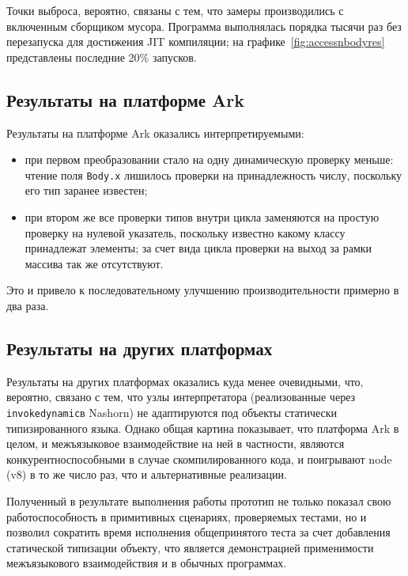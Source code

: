 \documentclass[times
]{itmo-student-thesis}
\def\Indy{\texttt{invokedynamic}}
\begin{document}
Точки выброса, вероятно, связаны с тем, что замеры производились с включенным сборщиком мусора. Программа выполнялась порядка тысячи раз без перезапуска для достижения JIT компиляции; на графике~\ref{fig:accessnbodyres} представлены последние 20\% запусков.

\subsection{Результаты на платформе Ark}
Результаты на платформе Ark оказались интерпретируемыми:
\begin{itemize}
\item при первом преобразовании стало на одну динамическую проверку меньше: чтение поля \texttt{Body.x} лишилось проверки на принадлежность числу, поскольку его тип заранее известен;
\item при втором же все проверки типов внутри цикла заменяются на простую проверку на нулевой указатель, поскольку известно какому классу принадлежат элементы; за счет вида цикла проверки на выход за рамки массива так же отсутствуют.
\end{itemize}

Это и привело к последовательному улучшению производительности примерно в два раза.

\subsection{Результаты на других платформах}
Результаты на других платформах оказались куда менее очевидными, что, вероятно, связано с тем, что узлы интерпретатора (реализованные через \Indy в Nashorn) не адаптируются под объекты статически типизированного языка. Однако общая картина показывает, что платформа Ark в целом, и межъязыковое взаимодействие на ней в частности, являются конкурентноспособными в случае скомпилированного кода, и поигрывают node (v8) в то же число раз, что и альтернативные реализации.

\chapterconclusion
Полученный в результате выполнения работы прототип не только показал свою работоспособность в примитивных сценариях, проверяемых тестами, но и позволил сократить время исполнения общепринятого теста за счет добавления статической типизации объекту, что является демонстрацией применимости межъязыкового взаимодействия и в обычных программах.
\end{document}
